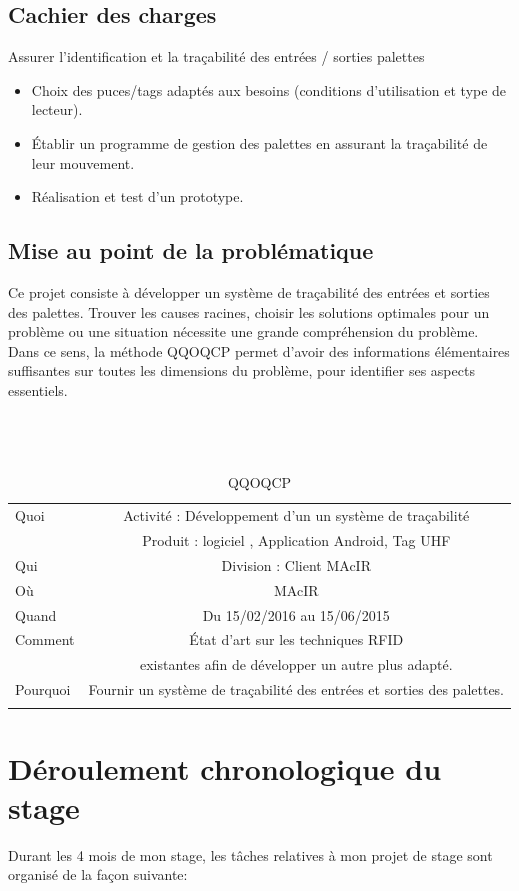 \documentclass[11pt, a4paper, twoside]{book}
\begin{document}
\subsection{Cachier des charges}
Assurer l’identification et la traçabilité des entrées / sorties palettes
\begin{itemize}
\item Choix des puces/tags adaptés aux besoins (conditions d’utilisation et type de lecteur).
\item Établir un programme de gestion des palettes en assurant la traçabilité de leur mouvement.
\item Réalisation et test d’un prototype.\\
\end{itemize}
\subsection{Mise au point de la problématique}
Ce projet consiste à développer un système de traçabilité des entrées et sorties des palettes. Trouver les causes racines, choisir les solutions optimales pour un problème ou une situation nécessite une grande compréhension du problème. Dans ce sens, la méthode QQOQCP permet d'avoir des informations élémentaires suffisantes sur toutes les dimensions du problème, pour identifier ses aspects essentiels.\\\\\\\
        
\begin{longtable}{|l|c|}
  \hline
  Quoi & Activité : Développement d’un un système de traçabilité \\
       &  Produit : logiciel , Application Android, Tag UHF \\
  \hline
  Qui & Division : Client MAcIR\\
  \hline
  Où & MAcIR\\
  \hline
  Quand & Du 15/02/2016 au 15/06/2015\\
  \hline
  Comment & État d’art sur les techniques RFID \\
          &  existantes afin de développer un autre plus adapté.\\
  \hline
  Pourquoi & Fournir un système de traçabilité des entrées et sorties des palettes.\\
  \hline
  
\caption{QQOQCP}
\end{longtable}

\section{Déroulement chronologique du stage}
Durant les 4 mois de mon stage, les tâches relatives à mon projet de stage sont organisé de la façon suivante:
\end{document}
